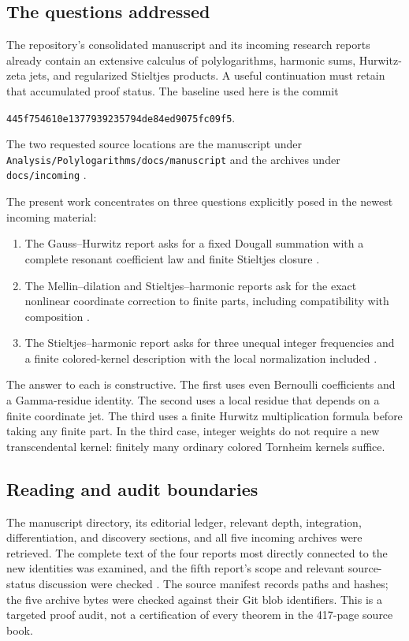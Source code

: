 \documentclass[11pt,a4paper]{article}
\numberwithin{equation}{section}
\theoremstyle{definition}
\theoremstyle{remark}
\newcommand{\src}[1]{\nolinkurl{#1}}
\newcommand{\pin}{\texttt{445f754610e1377939235794de84ed9075fc09f5}}
\begin{document}
\subsection{The questions addressed}
The repository's consolidated manuscript and its incoming research reports
already contain an extensive calculus of polylogarithms, harmonic sums,
Hurwitz-zeta jets, and regularized Stieltjes products. A useful continuation
must retain that accumulated proof status. The baseline used here is the
commit
\begin{center}\small\pin.\end{center}
The two requested source locations are the manuscript under
\src{Analysis/Polylogarithms/docs/manuscript} and the archives under
\src{docs/incoming} \cite{repo}.

The present work concentrates on three questions explicitly posed in the
newest incoming material:
\begin{enumerate}
\item The Gauss--Hurwitz report asks for a fixed Dougall summation with a
complete resonant coefficient law and finite Stieltjes closure
\cite[Section 9, Question 1]{incoming-gh}.
\item The Mellin--dilation and Stieltjes--harmonic reports ask for the exact
nonlinear coordinate correction to finite parts, including compatibility
with composition \cite{incoming-md,incoming-sh}.
\item The Stieltjes--harmonic report asks for three unequal integer
frequencies and a finite colored-kernel description with the local
normalization included \cite[Further research: three unequal integer
frequencies]{incoming-sh}.
\end{enumerate}
The answer to each is constructive. The first uses even Bernoulli
coefficients and a Gamma-residue identity. The second uses a local residue
that depends on a finite coordinate jet. The third uses a finite Hurwitz
multiplication formula before taking any finite part. In the third case,
integer weights do not require a new transcendental kernel: finitely many
ordinary colored Tornheim kernels suffice.

\subsection{Reading and audit boundaries}
The manuscript directory, its editorial ledger, relevant depth,
integration, differentiation, and discovery sections, and all five incoming
archives were retrieved. The complete text of the four reports most
directly connected to the new identities was examined, and the fifth
report's scope and relevant source-status discussion were checked
\cite{incoming-nhj,incoming-continuation}.
The source manifest records paths and hashes; the five archive bytes were
checked against their Git blob identifiers. This is a targeted proof
audit, not a certification of every theorem in the 417-page source book.
\end{document}
